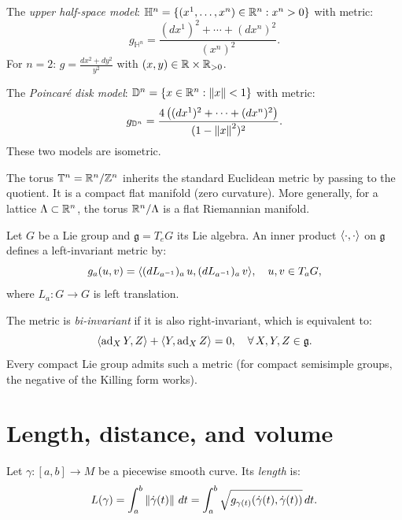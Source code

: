 \begin{example}
\label{ex:hyperbolic}
The \emph{upper half-space model}: $\mathbb{H}^n = \{(x^1, \ldots, x^n)
\in \mathbb{R}^n : x^n > 0\}$ with metric:
\[
    g_{\mathbb{H}^n} = \frac{(dx^1)^2 + \cdots + (dx^n)^2}{(x^n)^2}.
\]
For $n = 2$: $g = \frac{dx^2 + dy^2}{y^2}$ with $(x, y) \in \mathbb{R} \times \mathbb{R}_{>0}$.

The \emph{Poincar\'e disk model}: $\mathbb{D}^n = \{x \in \mathbb{R}^n : \left\| x \right\| < 1\}$
with metric:
\[
    g_{\mathbb{D}^n} = \frac{4\left((dx^1)^2 + \cdots + (dx^n)^2\right)}{(1 - \left\| x \right\|^2)^2}.
\]
These two models are isometric.
\end{example}

\begin{example}
\label{ex:torus}
The torus $\mathbb{T}^n = \mathbb{R}^n / \mathbb{Z}^n$ inherits the standard Euclidean metric
by passing to the quotient. It is a compact flat manifold (zero curvature).
More generally, for a lattice $\Lambda \subset \mathbb{R}^n$, the torus $\mathbb{R}^n/\Lambda$
is a flat Riemannian manifold.
\end{example}

\begin{example}
\label{ex:lie}
Let $G$ be a Lie group and $\mathfrak{g} = T_eG$ its Lie algebra. An inner
product $\langle \cdot, \cdot \rangle$ on $\mathfrak{g}$ defines a left-invariant metric by:
\[
    g_a(u, v) = \langle (dL_{a^{-1}})_a\, u, (dL_{a^{-1}})_a\, v \rangle,
    \quad u, v \in T_aG,
\]
where $L_a : G \to G$ is left translation.

The metric is \emph{bi-invariant} if it is also right-invariant, which is equivalent to:
\[
    \langle \operatorname{ad}_X Y, Z \rangle + \langle Y, \operatorname{ad}_X Z \rangle = 0,
    \quad \forall\, X, Y, Z \in \mathfrak{g}.
\]
Every compact Lie group admits such a metric (for compact semisimple groups,
the negative of the Killing form works).
\end{example}

\section{Length, distance, and volume}

\begin{definition}
Let $\gamma : [a,b] \to M$ be a piecewise smooth curve. Its \emph{length} is:
\[
    L(\gamma) = \int_a^b \left\| \dot{\gamma}(t) \right\| \, dt
    = \int_a^b \sqrt{g_{\gamma(t)}(\dot{\gamma}(t), \dot{\gamma}(t))} \, dt.
\]
\end{definition}

